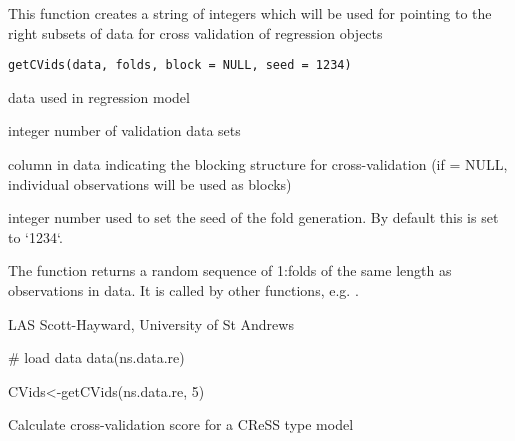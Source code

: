 \documentclass[a4paper]{book}
\begin{document}
%
\begin{Description}\relax
This function creates a string of integers which will be used for pointing to the right subsets of data for cross validation of regression objects
\end{Description}
%
\begin{Usage}
\begin{verbatim}
getCVids(data, folds, block = NULL, seed = 1234)
\end{verbatim}
\end{Usage}
%
\begin{Arguments}
\begin{ldescription}
\item[\code{data}] data used in regression model

\item[\code{folds}] integer number of validation data sets

\item[\code{block}] column in data indicating the blocking structure for cross-validation (if  = NULL, individual observations will be used as blocks)

\item[\code{seed}] integer number used to set the seed of the fold generation.  By default this is set to `1234`.
\end{ldescription}
\end{Arguments}
%
\begin{Details}\relax
The function returns a random sequence of 1:folds of the same length as observations in data. It is called by other functions, e.g. .
\end{Details}
%
\begin{Author}\relax
LAS Scott-Hayward, University of St Andrews
\end{Author}
%
\begin{Examples}
\begin{ExampleCode}
# load data
data(ns.data.re)

CVids<-getCVids(ns.data.re, 5)

\end{ExampleCode}
\end{Examples}
%
\begin{Description}\relax
Calculate cross-validation score for a CReSS type model
\end{Description}
\end{document}
